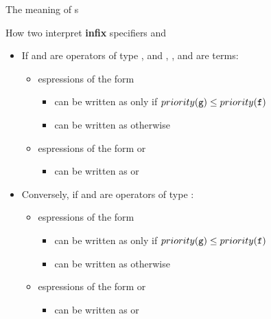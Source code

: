 \documentclass[handout]{beamer}
\begin{document}
\begin{frame}[allowframebreaks]{The meaning of s}
    \begin{exampleblock}{How two interpret \textbf{infix} specifiers  and }
        \begin{itemize}
            \item If  and  are operators of type , and , , and  are terms:
            \begin{itemize}
                \item espressions of the form \alert{}
                \begin{itemize}
                    \item can be written as \alert{} only if $priority(\texttt{g}) \leq priority(\texttt{f})$
                    \item can be written as \alert{} otherwise
                \end{itemize}

                \item espressions of the form \alert{} or \alert{}
                \begin{itemize}
                    \item can be written as \alert{} or \alert{}
                \end{itemize}
            \end{itemize}

            \item Conversely, if  and  are operators of type :
            \begin{itemize}
                \item espressions of the form \alert{}
                \begin{itemize}
                    \item can be written as \alert{} only if $priority(\texttt{g}) \leq priority(\texttt{f})$
                    \item can be written as \alert{} otherwise
                \end{itemize}

                \item espressions of the form \alert{} or \alert{}
                \begin{itemize}
                    \item can be written as \alert{} or \alert{}
                \end{itemize}
            \end{itemize}
        \end{itemize}
    \end{exampleblock}


\end{frame}
\end{document}
